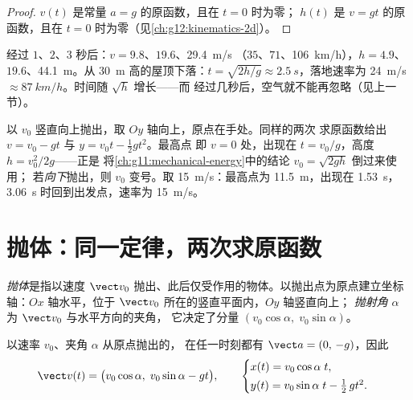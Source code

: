 \begin{proof}
$v(t)$ 是常量 $a = g$ 的原函数，且在 $t = 0$ 时为零；
$h(t)$ 是 $v = gt$ 的原函数，且在 $t = 0$ 时为零（见\cref{ch:g12:kinematics-2d}）。
\end{proof}

\begin{example}[数量级]\label{ex:g12:projectile-motion:orders}
经过 $1$、$2$、$3$ 秒后：$v = 9.8$、$19.6$、\qty{29.4}{m/s}
（$35$、$71$、\qty{106}{km/h}），$h = 4.9$、$19.6$、\qty{44.1}{m}。从
\qty{30}{m} 高的屋顶下落：$t = \sqrt{2h/g} \approx \qty{2.5}{s}$，落地速率为
\qty{24}{m/s} $\approx \qty{87}{km/h}$。时间随 $\sqrt h$ 增长——而
经过几秒后，空气就不能再忽略（见上一节）。
\end{example}

\begin{example}[竖直上抛]\label{ex:g12:projectile-motion:throw}
以 $v_0$ 竖直向上抛出，取 $Oy$ 轴向上，原点在手处。同样的两次
求原函数给出 $v = v_0 - gt$ 与 $y = v_0 t - \tfrac12 gt^2$。最高点
即 $v = 0$ 处，出现在 $t = v_0/g$，高度 $h = v_0^2/2g$——正是
将\cref{ch:g11:mechanical-energy}中的结论 $v_0 = \sqrt{2gh}$ 倒过来使用；
若\emph{向下}抛出，则 $v_0$ 变号。取 \qty{15}{m/s}：最高点为
\qty{11.5}{m}，出现在 \qty{1.53}{s}，\qty{3.06}{s} 时回到出发点，速率为 \qty{15}{m/s}。
\end{example}

\section{抛体：同一定律，两次求原函数}

\begin{definition}[抛体]\label{def:g12:projectile-motion:projectile}
\emph{抛体}是指以速度
$\vect v_0$ 抛出、此后仅受作用的物体。以抛出点为原点建立坐标轴：$Ox$
轴水平，位于 $\vect v_0$ 所在的竖直平面内，$Oy$ 轴竖直向上；
\emph{抛射角} $\alpha$ 为 $\vect v_0$ 与水平方向的夹角，
它决定了分量 $(v_0\cos\alpha,\; v_0\sin\alpha)$。
\end{definition}

\begin{theorem}[运动方程]\label{thm:g12:projectile-motion:equations}
以速率 $v_0$、夹角 $\alpha$ 从原点抛出的，
在任一时刻都有 $\vect a = (0,\,-g)$，因此
\[
\vect v(t) = \bigl(v_0\cos\alpha,\; v_0\sin\alpha - g t\bigr),
\qquad
\begin{cases}
x(t) = v_0\cos\alpha\; t,\\[2pt]
y(t) = v_0\sin\alpha\; t - \tfrac12\, g t^2 .
\end{cases}
\]
\end{theorem}

